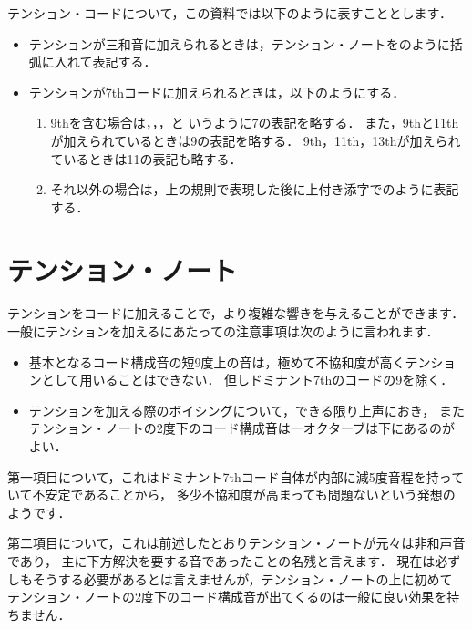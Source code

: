 \documentclass[dvipdfmx,uplatex,b5paper,openany,jbase=12Q,nomag*,textwidth-limit=44%
               ]{gachimuchi}
\begin{document}
テンション・コードについて，この資料では以下のように表すこととします．
\begin{itemize}
  \item テンションが三和音に加えられるときは，テンション・ノートを\Gni{}のように括弧に入れて表記する．
  \item テンションが7thコードに加えられるときは，以下のようにする．
  \begin{enumerate}
    \item \bNatural 9thを含む場合は\Gni{}，\Gni\Min{}，\Gni{}，\Gni\Min{}と
    いうように7の表記を略する．
    また，\bNatural 9thと\bNatural 11thが加えられているときは9の表記を略する．
    \bNatural 9th，\bNatural 11th，\bNatural 13thが加えられているときは11の表記も略する．
    \item それ以外の場合は，上の規則で表現した後に上付き添字で\Gni{}のように表記する．
  \end{enumerate}
\end{itemize}

\section{テンション・ノート}
テンションをコードに加えることで，より複雑な響きを与えることができます．
一般にテンションを加えるにあたっての注意事項は次のように言われます．
\begin{itemize}
  \item 基本となるコード構成音の短9度上の音は，極めて不協和度が高くテンションとして用いることはできない．
  但しドミナント7thのコードの\bFlat 9を除く．
  \item テンションを加える際のボイシングについて，できる限り上声におき，
  またテンション・ノートの2度下のコード構成音は一オクターブは下にあるのがよい．
\end{itemize}

第一項目について，これはドミナント7thコード自体が内部に減5度音程を持っていて不安定であることから，
多少不協和度が高まっても問題ないという発想のようです．

第二項目について，これは前述したとおりテンション・ノートが元々は非和声音であり，
主に下方解決を要する音であったことの名残と言えます．
現在は必ずしもそうする必要があるとは言えませんが，テンション・ノートの上に初めて
テンション・ノートの2度下のコード構成音が出てくるのは一般に良い効果を持ちません．
\end{document}
